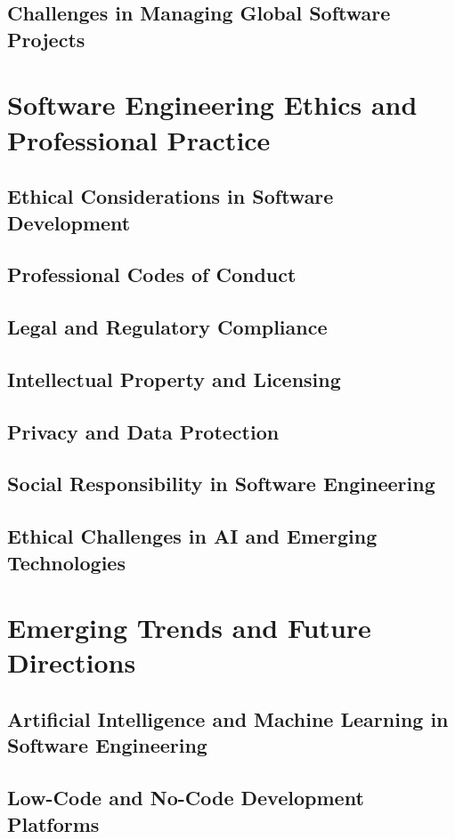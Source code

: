 \begin{refsection}
\subsection{Challenges in Managing Global Software Projects}
\newpage

\section{Software Engineering Ethics and Professional Practice}
\subsection{Ethical Considerations in Software Development}
\subsection{Professional Codes of Conduct}
\subsection{Legal and Regulatory Compliance}
\subsection{Intellectual Property and Licensing}
\subsection{Privacy and Data Protection}
\subsection{Social Responsibility in Software Engineering}
\subsection{Ethical Challenges in AI and Emerging Technologies}

\newpage

\section{Emerging Trends and Future Directions}
\subsection{Artificial Intelligence and Machine Learning in Software Engineering}
\subsection{Low-Code and No-Code Development Platforms}

\end{refsection}
